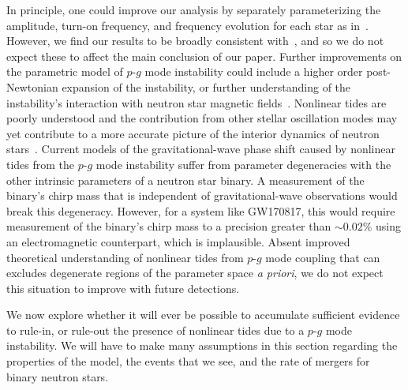 In principle, one could improve our analysis by separately parameterizing the amplitude, turn-on frequency, and frequency evolution for each star as in~\cite{abbott2019constraining}. However, we find our results to be broadly consistent with~\cite{abbott2019constraining}, and so we do not expect these to affect the main conclusion of our paper. Further improvements on the  parametric model of $p$-$g$ mode instability could include a higher order post-Newtonian expansion of the instability, or further understanding of the instability's interaction with neutron star magnetic fields~\citep{Weinberg:2015pxa}. Nonlinear tides are poorly understood and the contribution from other stellar oscillation modes may yet contribute to a more accurate picture of the interior dynamics of neutron stars~\citep{Andersson:2017iav}. Current models of the gravitational-wave phase shift caused by nonlinear tides from the $p$-$g$ mode instability  suffer from parameter degeneracies with the other intrinsic parameters of a neutron star binary. A measurement of the binary's chirp mass that is independent of gravitational-wave observations would break this degeneracy. However, for a system like GW170817, this would require measurement of the binary's chirp mass to a precision greater than $\sim 0.02 \%$ using an electromagnetic counterpart, which is implausible. Absent improved theoretical understanding of  nonlinear tides from $p$-$g$ mode coupling that can excludes degenerate regions of the parameter space \emph{a priori}, we do not expect this situation to improve with future detections.

We now explore whether it will ever be possible to accumulate sufficient evidence to rule-in, or rule-out the presence of nonlinear tides due to a $p$-$g$ mode instability. We will have to make many assumptions in this section regarding the properties of the model, the events that we see, and the rate of mergers for binary neutron stars.


